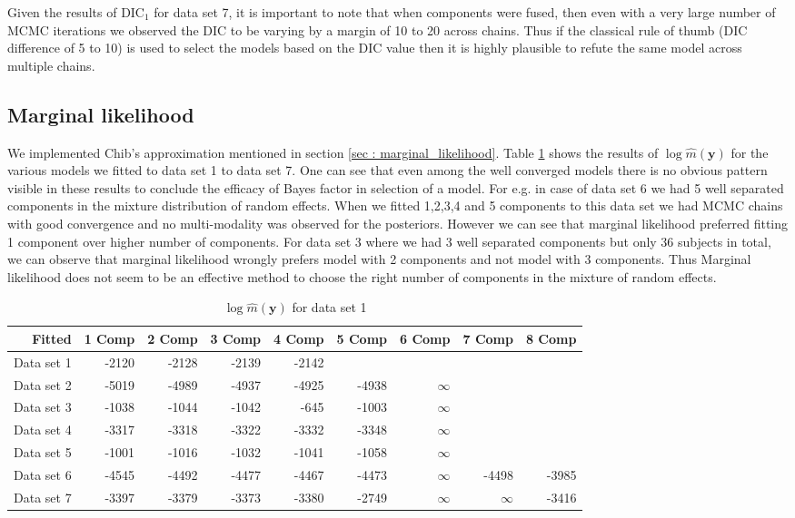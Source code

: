 Given the results of $\text{DIC}_1$ for data set 7, it is important to note that when components were fused, then even with a very large number of MCMC iterations we observed the DIC to be varying by a margin of 10 to 20 across chains. Thus if the classical rule of thumb (DIC difference of 5 to 10) is used to select the models based on the DIC value then it is highly plausible to refute the same model across multiple chains.

\subsection{Marginal likelihood}
\label{subsec : marginal_likelihood_simulation}
We implemented Chib's approximation mentioned in section \ref{sec : marginal_likelihood}. Table \ref{table : marginal_likelihood_results} shows the results of $\log{\hat{m}(\boldsymbol{y})}$ for the various models we fitted to data set 1 to data set 7. One can see that even among the well converged models there is no obvious pattern visible in these results to conclude the efficacy of Bayes factor in selection of a model. For e.g. in case of data set 6 we had 5 well separated components in the mixture distribution of random effects. When we fitted 1,2,3,4 and 5 components to this data set we had MCMC chains with good convergence and no multi-modality was observed for the posteriors. However we can see that marginal likelihood preferred fitting 1 component over higher number of components. For data set 3 where we had 3 well separated components but only 36 subjects in total, we can observe that marginal likelihood wrongly prefers model with 2 components and not model with 3 components. Thus Marginal likelihood does not seem to be an effective method to choose the right number of components in the mixture of random effects.

\begin{table}[!htb]
\centering
\captionsetup{justification=centering}
\caption{$\log{\hat{m}(\boldsymbol{y})}$ for data set 1}
\label{table : marginal_likelihood_results} 
\begin{tabular}{rrrrrrrrr}
\toprule
Fitted & 1 Comp & 2 Comp & 3 Comp & 4 Comp & 5 Comp & 6 Comp & 7 Comp & 8 Comp \\\midrule
Data set 1 & -2120 & -2128 & -2139 & -2142 &  &  &  &  \\
Data set 2 & -5019 & -4989 & -4937 & -4925 & -4938 & $\infty$ &  &  \\
Data set 3 & -1038 & -1044 & -1042 & -645 & -1003 & $\infty$ &  &  \\
Data set 4 & -3317 & -3318 & -3322 & -3332 & -3348 & $\infty$ &  &  \\
Data set 5 & -1001 & -1016 & -1032 & -1041 & -1058 & $\infty$ &  &  \\
Data set 6 & -4545 & -4492 & -4477 & -4467 & -4473 & $\infty$ & -4498 & -3985 \\
Data set 7 & -3397 & -3379 & -3373 & -3380 & -2749 & $\infty$ & $\infty$ & -3416 \\ \bottomrule
\end{tabular}
\end{table}

